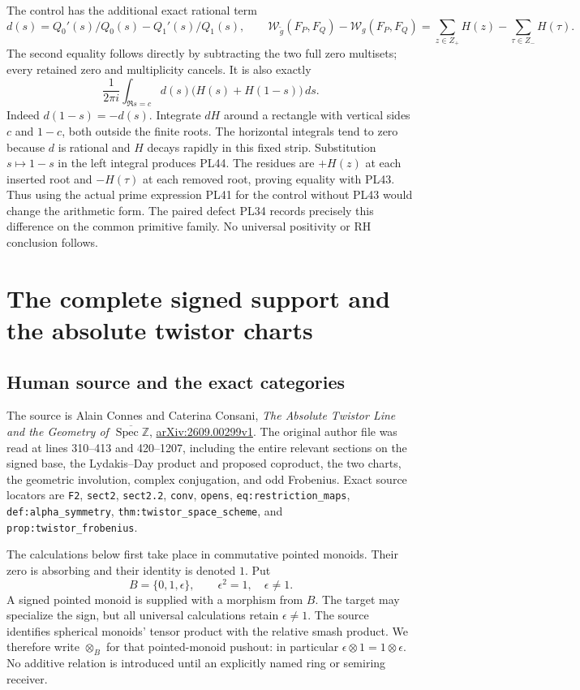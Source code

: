 \documentclass[11pt,a4paper]{article}
\theoremstyle{definition}\newtheorem{definition}[theorem]{Definition}
\newcommand{\Z}{\mathbb Z}\newcommand{\Q}{\mathbb Q}
\newcommand{\Spec}{\operatorname{Spec}}\newcommand{\SpecMon}{\operatorname{Spec}_{\mathrm{mon}}}
\begin{document}
The control has the additional exact rational term
\[
 d(s)=Q_0'(s)/Q_0(s)-Q_1'(s)/Q_1(s),
 \qquad
 \mathcal W_{\widetilde g}(F_P,F_Q)-\mathcal W_g(F_P,F_Q)
       =\sum_{z\in Z_+}H(z)-\sum_{\tau\in Z_-}H(\tau).
 \tag{PL43}\label{pl:pl:rational}
\]
The second equality follows directly by subtracting the two full
zero multisets; every retained zero and multiplicity cancels.
It is also exactly
\[
 \frac1{2\pi i}\int_{\Re s=c}
                    d(s)\bigl(H(s)+H(1-s)\bigr)\,ds.
 \tag{PL44}
\]
Indeed \(d(1-s)=-d(s)\). Integrate \(dH\) around a rectangle with
vertical sides \(c\) and \(1-c\), both outside the finite roots.
The horizontal integrals tend to zero because \(d\) is rational
and \(H\) decays rapidly in this fixed strip. Substitution
\(s\mapsto1-s\) in the left integral produces PL44. The residues
are \(+H(z)\) at each inserted root and \(-H(\tau)\) at each
removed root, proving equality with PL43.
Thus using the actual prime expression PL41 for the control
without PL43 would change the arithmetic form. The paired defect
PL34 records precisely this difference on the common primitive
family. No universal positivity or RH conclusion follows.


\section{The complete signed support and the absolute twistor charts}


\subsection{Human source and the exact categories}

The source is Alain Connes and Caterina Consani,
\emph{The Absolute Twistor Line and the Geometry of
$\overline{\Spec\Z}$},
\href{https://arxiv.org/abs/2609.00299v1}{arXiv:2609.00299v1}.
The original author file  was read at lines
310--413 and 420--1207, including the entire relevant sections on
the signed base, the Lydakis--Day product and proposed coproduct,
the two charts, the geometric involution, complex conjugation,
and odd Frobenius. Exact source locators are
\texttt{F2}, \texttt{sect2}, \texttt{sect2.2}, \texttt{conv},
\texttt{opens}, \texttt{eq:restriction\_maps},
\texttt{def:alpha\_symmetry}, \texttt{thm:twistor\_space\_scheme},
and \texttt{prop:twistor\_frobenius}.

The calculations below first take place in commutative pointed
monoids. Their zero is absorbing and their identity is denoted $1$.
Put
\[
 B=\{0,1,\epsilon\},\qquad\epsilon^2=1,\quad\epsilon\ne1.
 \tag{AT1}\label{at:eq:signed-base}
\]
A signed pointed monoid is supplied with a morphism from $B$.
The target may specialize the sign, but all universal calculations
retain $\epsilon\ne1$. The source identifies spherical monoids'
tensor product with the relative smash product. We therefore write
$\otimes_B$ for that pointed-monoid pushout: in particular
$\epsilon\otimes1=1\otimes\epsilon$. No additive relation is
introduced until an explicitly named ring or semiring receiver.
\end{document}
